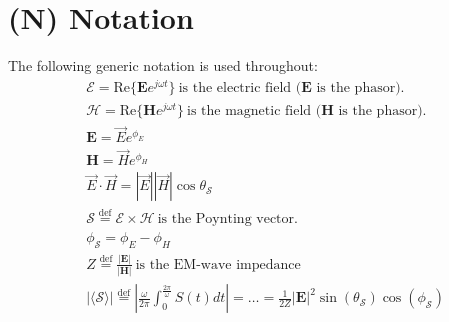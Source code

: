\documentclass{article}
\begin{document}
\section*{(N) Notation}
The following generic notation is used throughout:
\begin{align}
   & \mathcal{E} = \text{Re}\{ \mathbf{E} e^{j \omega t } \} \ \text{is the electric field (}
      \mathbf{E} \text{ is the phasor).}
      \label{eq:eFieldDef} \\
   & \mathcal{H} = \text{Re}\{ \mathbf{H} e^{j \omega t } \} \ \text{is the magnetic field (}
      \mathbf{H} \text{ is the phasor).}
      \label{eq:hFieldDef} \\
   & \mathbf{E} = \vec{E} e^{\phi_E}
      \label{eq:ePhasorDef} \\
   & \mathbf{H} = \vec{H} e^{\phi_H}
      \label{eq:hPhasorDef} \\
   & \vec{E} \cdot \vec{H} = | \vec{E} | | \vec{H} | \cos
      \theta_{\mathcal{S}}
      \label{eq:spatialAngleDef} \\
   & \mathcal{S} \overset{\text{def}}{=} \mathcal{E} \times \mathcal{H} \ \text{is the
      Poynting vector.}
      \label{eq:poyntingDef} \\
   & \phi_{\mathcal{S}} = \phi_E - \phi_H \\
   & Z \overset{\text{def}}{=} \frac{|\mathbf{E}|}{|\mathbf{H}|} \ \text{is the EM-wave impedance}
      \label{eq:impedanceDef} \\
   & | \langle \mathcal{ S } \rangle | \overset{\text{def}}{=} \left| \frac{\omega}{2
      \pi} \int_{0}^{\frac{2 \pi}{\omega}} S(t) dt \right| = \ldots =
      \frac{1}{2Z} |\mathbf{E}|^2 \sin (\theta_{\mathcal{S}}) \cos (
      \phi_{\mathcal{S}} )
      \label{eq:poyntingAvgDef}
\end{align}

\setcounter{section}{6} %
\setcounter{subsection}{-1}
\setcounter{equation}{0}
\end{document}

